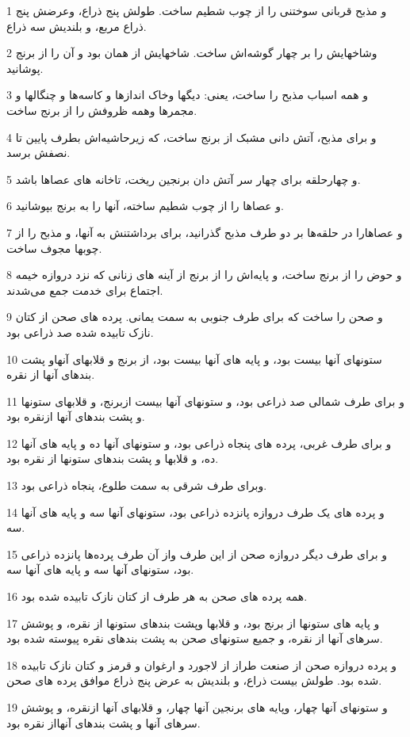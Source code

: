 \par 1 و مذبح قربانی سوختنی را از چوب شطیم ساخت. طولش پنج ذراع، وعرضش پنج ذراع مربع، و بلندیش سه ذراع.
\par 2 وشاخهایش را بر چهار گوشه‌اش ساخت. شاخهایش از همان بود و آن را از برنج پوشانید.
\par 3 و همه اسباب مذبح را ساخت، یعنی: دیگها وخاک اندازها و کاسه‌ها و چنگالها و مجمرها وهمه ظروفش را از برنج ساخت.
\par 4 و برای مذبح، آتش دانی مشبک از برنج ساخت، که زیرحاشیه‌اش بطرف پایین تا نصفش برسد.
\par 5 و چهارحلقه برای چهار سر آتش دان برنجین ریخت، تاخانه های عصاها باشد.
\par 6 و عصاها را از چوب شطیم ساخته، آنها را به برنج بپوشانید.
\par 7 و عصاهارا در حلقه‌ها بر دو طرف مذبح گذرانید، برای برداشتنش به آنها، و مذبح را از چوبها مجوف ساخت.
\par 8 و حوض را از برنج ساخت، و پایه‌اش را از برنج از آینه های زنانی که نزد دروازه خیمه اجتماع برای خدمت جمع می‌شدند.
\par 9 و صحن را ساخت که برای طرف جنوبی به سمت یمانی. پرده های صحن از کتان نازک تابیده شده صد ذراعی بود.
\par 10 ستونهای آنها بیست بود، و پایه های آنها بیست بود، از برنج و قلابهای آنهاو پشت بندهای آنها از نقره.
\par 11 و برای طرف شمالی صد ذراعی بود، و ستونهای آنها بیست ازبرنج، و قلابهای ستونها و پشت بندهای آنها ازنقره بود.
\par 12 و برای طرف غربی، پرده های پنجاه ذراعی بود، و ستونهای آنها ده و پایه های آنها ده، و قلابها و پشت بندهای ستونها از نقره بود.
\par 13 وبرای طرف شرقی به سمت طلوع، پنجاه ذراعی بود.
\par 14 و پرده های یک طرف دروازه پانزده ذراعی بود، ستونهای آنها سه و پایه های آنها سه.
\par 15 و برای طرف دیگر دروازه صحن از این طرف واز آن طرف پرده‌ها پانزده ذراعی بود، ستونهای آنها سه و پایه های آنها سه.
\par 16 همه پرده های صحن به هر طرف از کتان نازک تابیده شده بود.
\par 17 و پایه های ستونها از برنج بود، و قلابها وپشت بندهای ستونها از نقره، و پوشش سرهای آنها از نقره، و جمیع ستونهای صحن به پشت بندهای نقره پیوسته شده بود.
\par 18 و پرده دروازه صحن از صنعت طراز از لاجورد و ارغوان و قرمز و کتان نازک تابیده شده بود. طولش بیست ذراع، و بلندیش به عرض پنج ذراع موافق پرده های صحن.
\par 19 و ستونهای آنها چهار، وپایه های برنجین آنها چهار، و قلابهای آنها ازنقره، و پوشش سرهای آنها و پشت بندهای آنهااز نقره بود.
